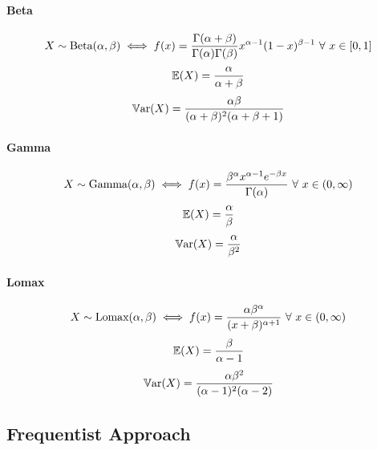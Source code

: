 \documentclass[a4paper]{article}
\begin{document}
            \paragraph{Beta}
                \[
                    X \sim \text{Beta}(\alpha, \beta) \iff f(x) =
                    \frac{\Gamma(\alpha + \beta)}{\Gamma(\alpha)\Gamma(\beta)}
                    x^{\alpha - 1}(1 - x)^{\beta - 1} \,\,\forall\,\, x \in [0, 1]
                \]
                \[
                    \mathbb{E}(X) = \frac{\alpha}{\alpha + \beta}
                \]
                \[
                    \mathbb{V}\text{ar}(X) = \frac{\alpha\beta}{(\alpha + \beta)^2(\alpha +
                    \beta + 1)}
                \]

            \paragraph{Gamma}
                \[
                    X \sim \text{Gamma}(\alpha, \beta) \iff f(x) =
                    \frac{\beta^\alpha x^{\alpha - 1}e^{-\beta x}}
                    {\Gamma(\alpha)} \,\,\forall\,\, x \in (0, \infty)
                \]
                \[
                    \mathbb{E}(X) = \frac{\alpha}{\beta}
                \]
                \[
                    \mathbb{V}\text{ar}(X) = \frac{\alpha}{\beta^2}
                \]

            \paragraph{Lomax}
                \[
                    X \sim \text{Lomax}(\alpha, \beta) \iff f(x) =
                    \frac{\alpha\beta^\alpha}{(x + \beta)^{\alpha + 1}} \,\,\forall\,\,
                    x \in (0, \infty)
                \]
                \[
                    \mathbb{E}(X) = \frac{\beta}{\alpha - 1}
                \]
                \[
                    \mathbb{V}\text{ar}(X) = \frac{\alpha\beta^2}{(\alpha - 1)^2(\alpha - 2)}
                \]

        \subsection*{Frequentist Approach}
\end{document}
